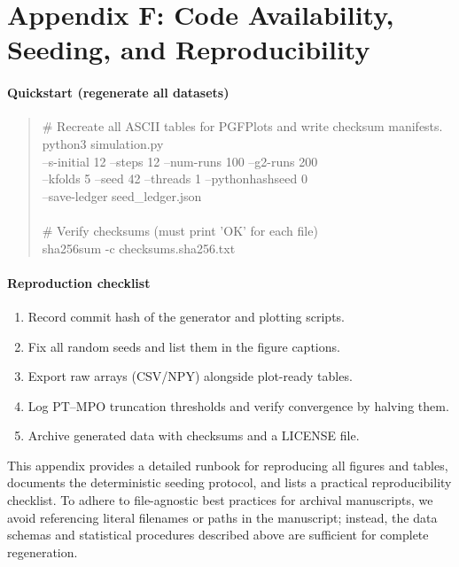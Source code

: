 \documentclass[a4paper,11pt]{article}
\theoremstyle{plain}
\theoremstyle{definition}
\theoremstyle{remark}
\begin{document}
\section{Appendix F: Code Availability, Seeding, and Reproducibility}
\label{app:code}

\paragraph{Quickstart (regenerate all datasets)}
\begin{quote}\small\ttfamily
\# Recreate all ASCII tables for PGFPlots and write checksum manifests.\\
python3 simulation.py\\
\quad --s-initial 12 --steps 12 --num-runs 100 --g2-runs 200\\
\quad --kfolds 5 --seed 42 --threads 1 --pythonhashseed 0\\
\quad --save-ledger seed\_ledger.json\\
\\
\# Verify checksums (must print 'OK' for each file)\\
sha256sum -c checksums.sha256.txt
\end{quote}

\paragraph{Reproduction checklist}
\begin{enumerate}[label=(\alph*)]
  \item Record commit hash of the generator and plotting scripts.
  \item Fix all random seeds and list them in the figure captions.
  \item Export raw arrays (CSV/NPY) alongside plot-ready tables.
  \item Log PT--MPO truncation thresholds and verify convergence by halving them.
  \item Archive generated data with checksums and a LICENSE file.
\end{enumerate}

This appendix provides a detailed runbook for reproducing all figures and tables, documents the deterministic seeding protocol, and lists a practical reproducibility checklist. To adhere to file-agnostic best practices for archival manuscripts, we avoid referencing literal filenames or paths in the manuscript; instead, the data schemas and statistical procedures described above are sufficient for complete regeneration.
\end{document}
